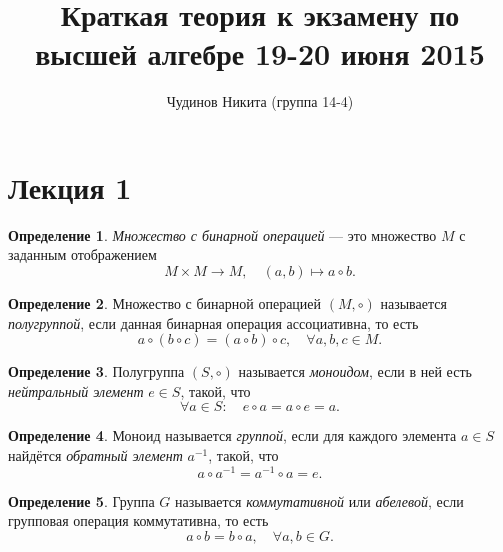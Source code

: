 \documentclass[a4paper]{article}
\theoremstyle{plain}
\theoremstyle{definition}
\newtheorem{definition}{Определение}
\numberwithin{definition}{section}
\numberwithin{proposal}{section}
\begin{document}
\sloppy
\author{Чудинов Никита (группа 14-4)}
\date{}
\title{\vspace{-1.7cm}Краткая теория к экзамену по высшей алгебре 19-20 июня 2015}
\frenchspacing

\maketitle

\section{Лекция 1}

\begin{definition}
\emph{Множество с бинарной операцией} --- это множество \(M\) с заданным отображением
\begin{equation*}
	M \times M \rightarrow M, \quad (a, b) \mapsto a \circ b.
\end{equation*}
\end{definition}

\begin{definition}
Множество с бинарной операцией \((M, \circ)\) называется \emph{полугруппой}, если данная бинарная операция ассоциативна, то есть
\begin{equation*}
	a \circ (b \circ c) = (a \circ b) \circ c, \quad \forall a,b,c \in M.
\end{equation*}
\end{definition}

\begin{definition}
Полугруппа \((S, \circ)\) называется \emph{моноидом}, если в ней есть \emph{нейтральный элемент} \(e \in S\), такой, что
\begin{equation*}
	\forall a \in S: \quad e \circ a = a \circ e = a.
\end{equation*}
\end{definition}

\begin{definition}
Моноид называется \emph{группой}, если для каждого элемента \(a \in S\) найдётся \emph{обратный элемент} \(a^{-1}\), такой, что
\begin{equation*}
	a \circ a^{-1} = a^{-1} \circ a = e.
\end{equation*}
\end{definition}

\begin{definition}
Группа \(G\) называется \emph{коммутативной} или \emph{абелевой}, если групповая операция коммутативна, то есть
\begin{equation*}
	a \circ b = b \circ a, \quad \forall a, b \in G.
\end{equation*}
\end{definition}
\end{document}
